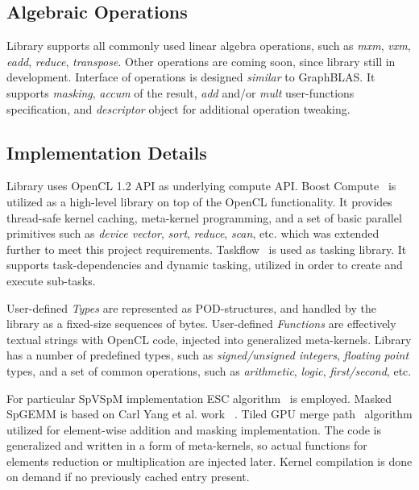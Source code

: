 \subsection{Algebraic Operations}

Library supports all commonly used linear algebra operations, such as \textit{mxm}, \textit{vxm}, \textit{eadd}, \textit{reduce}, \textit{transpose}. 
Other operations are coming soon, since library still in development.
Interface of operations is designed \textit{similar} to GraphBLAS. 
It supports \textit{masking}, \textit{accum} of the result, \textit{add} and/or \textit{mult} user-functions specification, and \textit{descriptor} object for additional operation tweaking.

\subsection{Implementation Details}

Library uses OpenCL 1.2 API as underlying compute API. 
Boost Compute~\cite{10.1145/2909437.2909454:boost:compute} is utilized as a high-level library on top of the OpenCL functionality. 
It provides thread-safe kernel caching, meta-kernel programming, and a set of basic parallel primitives such as \textit{device vector}, \textit{sort}, \textit{reduce}, \textit{scan}, etc. which was extended further to meet this project requirements.
Taskflow~\cite{Huang2022TaskflowAL} is used as tasking library. It supports task-dependencies and dynamic tasking, utilized in order to create and execute sub-tasks. 

User-defined \textit{Types} are represented as POD-structures, and handled by the library as a fixed-size sequences of bytes.
User-defined \textit{Functions} are effectively textual strings with OpenCL code, injected into generalized meta-kernels.
Library has a number of predefined types, such as \textit{signed/unsigned integers}, \textit{floating point} types, and a set of common operations, such as \textit{arithmetic}, \textit{logic}, \textit{first/second}, etc.

For particular SpVSpM implementation ESC algorithm~\cite{10.1145/2699470:esc:algo} is employed. 
Masked SpGEMM is based on Carl Yang et al. work ~\cite{yang2019graphblast}. 
Tiled GPU merge path~\cite{inproceedings:gpu_merge_path} algorithm utilized for element-wise addition and masking implementation.
The code is generalized and written in a form of meta-kernels, so actual functions for elements reduction or multiplication are injected later.
Kernel compilation is done on demand if no previously cached entry present.